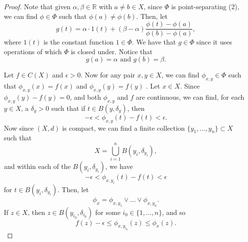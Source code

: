 \documentclass[notoc,notitlepage]{tufte-book}
\begin{document}
\begin{proof}
  Note that given $\alpha, \beta \in \mathbb{R}$ with $a \neq b \in X$, since $\Phi$ is point-separating (2), we can find $\phi \in \Phi$ such that $\phi(a) \neq \phi(b)$. Then, let
  \begin{equation*}
    g(t) = \alpha \cdot 1(t) + ( \beta - \alpha ) \frac{\phi(t) - \phi(a)}{\phi(b) - \phi(a)},
  \end{equation*}
  where $1(t)$ is the constant function $1 \in \Phi$. We have that $g \in \Phi$ since it uses operations of which $\Phi$ is closed under. Notice that
  \begin{equation*}
    g(a) = \alpha \text{ and } g(b) = \beta.
  \end{equation*}

  Let $f \in C(X)$ and $\epsilon > 0$. Now for any pair $x, y \in X$, we can find $\phi_{x, y} \in \Phi$ such that $\phi_{x, y}(x) = f(x)$ and $\phi_{x, y}(y) = f(y)$ . Let $x \in X$. Since $\phi_{x, y}(y) - f(y) = 0$, and both $\phi_{x, y}$ and $f$ are continuous, we can find, for each $y \in X$, a $\delta_y > 0$ such that if $t \in B\left(y, \delta_y\right)$, then
  \begin{equation*}
    -\epsilon < \phi_{x, y}(t) - f(t) < \epsilon.
  \end{equation*}
  Now since $(X, d)$ is compact, we can find a finite collection $\{ y_1, \ldots, y_n \} \subset X$ such that
  \begin{equation*}
    X = \bigcup_{i=1}^{n} B \left( y_i, \delta_{y_i} \right),
  \end{equation*}
  and within each of the $B ( y_i, \delta_{y_i} )$, we have
  \begin{equation*}
    - \epsilon < \phi_{x, y_i}(t) - f(t) < \epsilon
  \end{equation*}
  for $t \in B(y_i, \delta_{y_i})$. Then, let
  \begin{equation*}
    \phi_x = \phi_{x, y_1} \lor \hdots \lor \phi_{x, y_n}.
  \end{equation*}
  If $z \in X$, then $z \in B(y_{i_0}, \delta_{i_0})$ for some $i_0 \in \{ 1, \ldots, n \}$, and so
  \begin{equation*}
    f(z) - \epsilon \leq \phi_{x, y_{i_0}}(z) \leq \phi_x(z).
  \end{equation*}


\end{proof}
\end{document}
